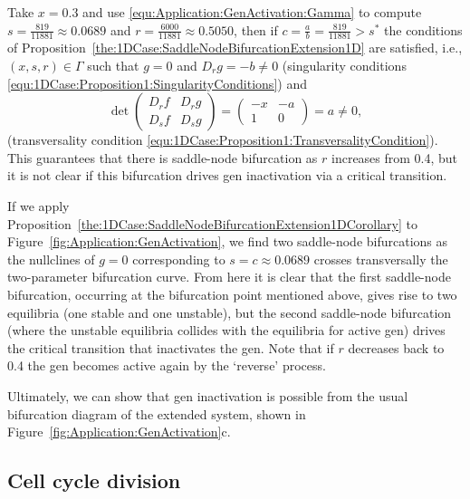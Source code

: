 \documentclass[12pt]{article}
\begin{document}
Take $x=0.3$ and use \eqref{equ:Application:GenActivation:Gamma} to compute $s=\tfrac{819}{11881}\approx0.0689$ and $r=\tfrac{6000}{11881}\approx 0.5050$, then if $c=\frac{a}{b}=\tfrac{819}{11881}>s^*$ the conditions of Proposition~\ref{the:1DCase:SaddleNodeBifurcationExtension1D} are satisfied, i.e., $(x,s,r)\in\Gamma$ such that $g=0$ and $D_{r}g=-b\neq 0$ (singularity conditions \eqref{equ:1DCase:Proposition1:SingularityConditions}) and
\[\det\begin{pmatrix}
            D_{r}f & D_{r}g \\
            D_{s}f & D_{s}g
        \end{pmatrix} = 
        \begin{pmatrix}
            -x & -a\\
            1 & 0
        \end{pmatrix} = a \neq 0,\]
(transversality condition \eqref{equ:1DCase:Proposition1:TransversalityCondition}). This guarantees that there is saddle-node bifurcation as $r$ increases from 0.4, but it is not clear if this bifurcation drives gen inactivation via a critical transition. 

If we apply Proposition~\ref{the:1DCase:SaddleNodeBifurcationExtension1DCorollary} to Figure~\ref{fig:Application:GenActivation}, we find two saddle-node bifurcations as the nullclines of $g=0$ corresponding to $s=c\approx0.0689$ crosses transversally the two-parameter bifurcation curve. From here it is clear that the first saddle-node bifurcation, occurring at the bifurcation point mentioned above, gives rise to two equilibria (one stable and one unstable), but the second saddle-node bifurcation (where the unstable equilibria collides with the equilibria for active gen) drives the critical transition that inactivates the gen. Note that if $r$ decreases back to 0.4 the gen becomes active again by the `reverse' process.

Ultimately, we can show that gen inactivation is possible from the usual bifurcation diagram of the extended system, shown in Figure~\ref{fig:Application:GenActivation}c. 

\subsection{Cell cycle division}
\end{document}
